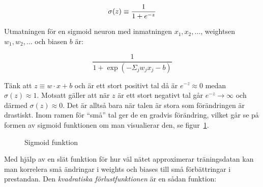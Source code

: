 \begin{equation}
	\sigma(z) \equiv \frac{1}{1 + e^{-z}} \\
\end{equation}

Utmatningen för en sigmoid neuron med inmatningen $ x_1, x_2,
\ldots$, weightsen $w_1, w_2, \ldots$ och biasen $b$ är:

\begin{equation}
	\frac{1}{1 + \exp(-\Sigma_jw_jx_j - b)}
\end{equation}


Tänk att $z \equiv w \cdot x + b $ och är ett stort positivt tal då är $e^{-z} \approx 0 $
medan $\sigma(z) \approx 1$.
Motsatt gäller att när $z$ är ett stort negativt tal går $e^{-z} \rightarrow
\infty $ och därmed $\sigma(z) \approx 0$. Det är alltså bara när talen är
stora som förändringen är drastiskt. Inom ramen för ``små'' tal ger de en
gradvis förändring, vilket går se på formen av sigmoid funktionen om man
visualierar den, se figur~\ref{fig:sigmoid}.

\begin{comment}
	Kolla så att det här faktiskt är rätt

Alltså kommer en liten förändring i en weight, $\Delta w_j$, eller bias,
$\Delta b_j$, att ge en liten förändirng i utmatningen,
$\Delta\text{utmatning}$:

\begin{equation}
	\Delta \mbox{utmatning} \approx \sum_j \frac{\partial \, \mbox{utmatning}}{\partial w_j}
	\Delta w_j + \frac{\partial \, \mbox{utmatning}}{\partial b} \Delta b,
\end{equation}

där summan betecknar de partiella derivatorna i förhållande till weights
respektive biases. Vilket innebär att $\Delta\text{utmatning}$ är
\end{comment}

\begin{figure}
	\centering
	\caption{Sigmoid funktion}
	\label{fig:sigmoid}
\end{figure}


Med hjälp av en slät funktion för hur väl nätet approximerar träningsdatan
kan man korrelera små ändringar i weights och biases
till små förbättringar i prestandan.
Den \emph{kvadratiska förlustfunktionen} är en sådan funktion:

